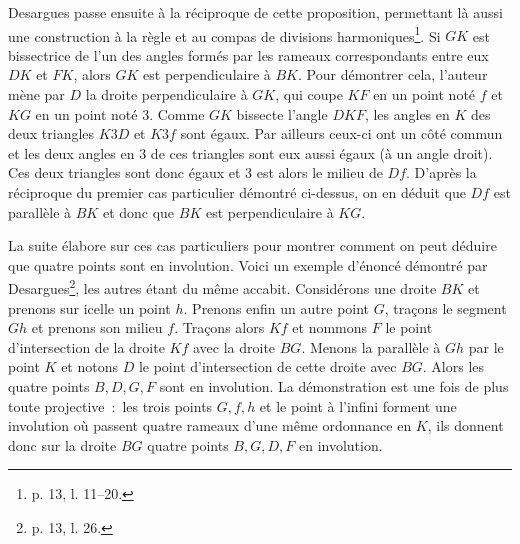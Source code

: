 \documentclass[12pt, a4paper]{article}
\begin{document}
Desargues passe ensuite à la réciproque de cette proposition, permettant là aussi une construction à la règle et au compas de divisions harmoniques\footnote{p. 13, l. 11--20.}. Si $GK$ est bissectrice de l'un des angles formés par les rameaux correspondants entre eux $DK$ et $FK$, alors $GK$ est perpendiculaire à $BK$. Pour démontrer cela, l'auteur mène par $D$ la droite perpendiculaire à $GK$, qui coupe $KF$ en un point noté $f$ et $KG$ en un point noté $3$. Comme $GK$ bissecte l'angle $DKF$, les angles en $K$ des deux triangles $K3D$ et $K3f$ sont égaux. Par ailleurs ceux-ci ont un côté commun et les deux angles en $3$ de ces triangles sont eux aussi égaux (à un angle droit). Ces deux triangles sont donc égaux et $3$ est alors le milieu de $Df$. D'après la réciproque du premier cas particulier démontré ci-dessus, on en déduit que $Df$ est parallèle à $BK$ et donc que $BK$ est perpendiculaire à $KG$. 

La suite élabore sur ces cas particuliers pour montrer comment on peut déduire que quatre points sont en involution. Voici un exemple d'énoncé démontré par Desargues\footnote{p. 13, l. 26.}, les autres étant du même accabit. Considérons une droite $BK$ et prenons sur icelle un point $h$. Prenons enfin un autre point $G$, traçons le segment $Gh$ et prenons son milieu $f$. Traçons alors $Kf$ et nommons $F$ le point d'intersection de la droite $Kf$ avec la droite $BG$. Menons la parallèle à $Gh$ par le point $K$ et notons $D$ le point d'intersection de cette droite avec $BG$. Alors les quatre points $B,D,G,F$ sont en involution. La démonstration est une fois de plus toute projective~:~les trois points $G,f,h$ et le point à l'infini forment une involution où passent quatre rameaux d'une même ordonnance en $K$, ils donnent donc sur la droite $BG$ quatre points $B,G,D,F$ en involution.
 
\end{document}
